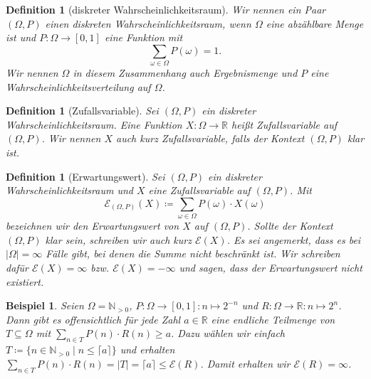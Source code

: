 \documentclass[a4paper]{article}
\newtheorem{beispiel}[satz]{Beispiel}
\newtheorem{definition}[satz]{Definition} %
\theoremstyle{nonumberplain}
\begin{document}
\newcommand{\probspace}{diskreter Wahr\-schein\-lich\-keits\-raum}
\newcommand{\probspacen}{diskreten Wahr\-schein\-lich\-keits\-raum}
\newcommand{\probspaceexraw}{(\Omega, P)}
\newcommand{\probspaceex}{$(\Omega, P)$}
\begin{definition}[\probspace{}] \label{def-probspace}
	\hspace{-0.5em} Wir nennen ein Paar \probspaceex{} einen \probspacen{}, wenn $\Omega$ eine abzählbare Menge ist und $P : \Omega \to [0,1] $ eine Funktion mit
	\begin{equation}
		\sum_{\omega \in \Omega} P(\omega) = 1 \text{.}
	\end{equation} Wir nennen $\Omega$ in diesem Zusammenhang auch Ergebnismenge und $P$ eine Wahr\-schein\-lich\-keitsverteilung auf $\Omega$.
\end{definition}
\newcommand{\rvar}{Zufallsvariable}
\begin{definition}[\rvar{}] \label{def-rvar}
	Sei \probspaceex{} ein \probspace{}. Eine Funktion $X : \Omega \to \mathbb{R}$ heißt \rvar{} auf \probspaceex{}. Wir nennen $X$ auch kurz \rvar{}, falls der Kontext \probspaceex{} klar ist.
\end{definition}
\newcommand{\expect}{Erwartungswert}
\newcommand{\mexp}{\mathcal{E}}
\begin{definition}[\expect{}] \label{def-expect}
	\hspace{1ex} Sei \probspaceex{} ein \probspace{} und $X$ eine \rvar{} auf \probspaceex{}. Mit
	\begin{equation}
		\mathcal{E}_{\probspaceexraw{}}(X) \coloneqq \sum_{\omega \in \Omega}{P(\omega) \cdot X(\omega)}
	\end{equation}
	bezeichnen wir den \expect{} von $X$ auf \probspaceex{}. Sollte der Kontext \probspaceex{} klar sein, schreiben wir auch kurz $\mathcal{E}(X)$. Es sei angemerkt, dass es bei $|\Omega|=\infty$ Fälle gibt, bei denen die Summe nicht beschränkt ist. Wir schreiben dafür $\mathcal{E}(X) = \infty$ bzw. $\mathcal{E}(X) = -\infty$ und sagen, dass der Erwartungswert nicht existiert.
\end{definition}
\begin{beispiel}
	Seien $\Omega = \mathbb{N}_{>0}$, $P : \Omega \to [0,1] : n \mapsto 2^{-n}$ und $R : \Omega \to \mathbb{R} : n \mapsto 2^{n}$. Dann gibt es offensichtlich für jede Zahl $a \in \mathbb{R}$ eine endliche Teilmenge von $T \subseteq \Omega$ mit $\sum_{n \in T}{P(n) \cdot R(n)} \geq a$. Dazu wählen wir einfach $T \coloneqq \{n \in \mathbb{N}_{>0}\mid n \leq \lceil a \rceil \}$ und erhalten $\sum_{n \in T}{P(n) \cdot R(n)} = |T| = \lceil a \rceil \leq \mathcal{E}(R)$. Damit erhalten wir $\mathcal{E}(R) = \infty$.
\end{beispiel}
\end{document}
